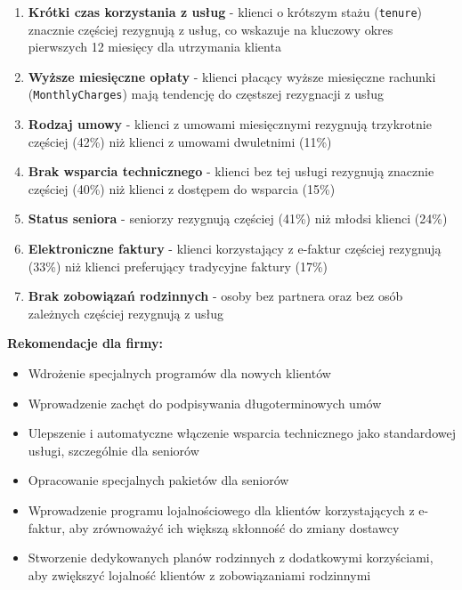 \documentclass[12pt, a4paper]{article}\usepackage[]{graphicx}\usepackage[]{xcolor}
\begin{document}
\begin{enumerate}
  \item \textbf{Krótki czas korzystania z usług} - klienci o krótszym stażu (\texttt{tenure}) znacznie częściej rezygnują z usług, co wskazuje na kluczowy okres pierwszych 12 miesięcy dla utrzymania klienta
  \item \textbf{Wyższe miesięczne opłaty} - klienci płacący wyższe miesięczne rachunki (\texttt{MonthlyCharges}) mają tendencję do częstszej rezygnacji z usług
  \item \textbf{Rodzaj umowy} - klienci z umowami miesięcznymi rezygnują trzykrotnie częściej (42\%) niż klienci z umowami dwuletnimi (11\%)
  \item \textbf{Brak wsparcia technicznego} - klienci bez tej usługi rezygnują znacznie częściej (40\%) niż klienci z dostępem do wsparcia (15\%)
  \item \textbf{Status seniora} - seniorzy rezygnują częściej (41\%) niż młodsi klienci (24\%)
  \item \textbf{Elektroniczne faktury} - klienci korzystający z e-faktur częściej rezygnują (33\%) niż klienci preferujący tradycyjne faktury (17\%)
  \item \textbf{Brak zobowiązań rodzinnych} - osoby bez partnera oraz bez osób zależnych częściej rezygnują z usług
\end{enumerate}

\textbf{Rekomendacje dla firmy:}
\begin{itemize}
  \item Wdrożenie specjalnych programów dla nowych klientów
  \item Wprowadzenie zachęt do podpisywania długoterminowych umów
  \item Ulepszenie i automatyczne włączenie wsparcia technicznego jako standardowej usługi, szczególnie dla seniorów
  \item Opracowanie specjalnych pakietów dla seniorów
  \item Wprowadzenie programu lojalnościowego dla klientów korzystających z e-faktur, aby zrównoważyć ich większą skłonność do zmiany dostawcy
  \item Stworzenie dedykowanych planów rodzinnych z dodatkowymi korzyściami, aby zwiększyć lojalność klientów z zobowiązaniami rodzinnymi
\end{itemize}
\end{document}

